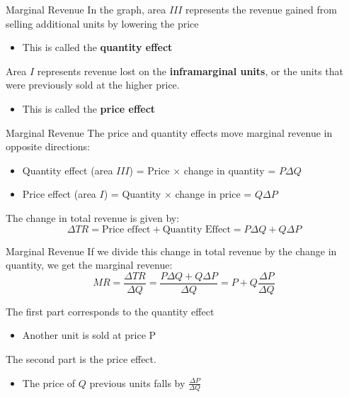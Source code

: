 \documentclass{beamer}
\begin{document}
\begin{frame}{Marginal Revenue}
  In the graph, area $III$ represents the revenue gained from selling additional units by lowering the price

  \begin{itemize}
    \item This is called the \textbf{quantity effect}
  \end{itemize}

  \bigskip
  Area $I$ represents revenue lost on the \textbf{inframarginal units}, or the units that were previously sold at the higher price.

  \begin{itemize}
    \item This is called the \textbf{price effect}
  \end{itemize}
\end{frame}

\begin{frame}{Marginal Revenue}
  The price and quantity effects move marginal revenue in opposite directions:

  \begin{itemize}
    \item Quantity effect (area $III$) = Price $\times$ change in quantity = $P \Delta Q$
    
    \item Price effect (area $I$) = Quantity $\times$ change in price = $Q \Delta P$
  \end{itemize}


  \bigskip
  The change in total revenue is given by:
  $$
    \Delta TR = \text{Price effect} + \text{Quantity Effect} = P\Delta Q + Q\Delta P
  $$
\end{frame}

\begin{frame}{Marginal Revenue}
  If we divide this change in total revenue by the change in quantity, we get the marginal revenue:
  $$
    MR = \frac{\Delta TR}{\Delta Q} = \frac{P\Delta Q + Q\Delta P}{\Delta Q}=P+Q\frac{\Delta P}{\Delta Q}
  $$
  
  \bigskip
  The first part corresponds to the quantity effect
  \begin{itemize}
    \item Another unit is sold at price P
  \end{itemize}
  
  \bigskip
  The second part is the price effect.
  \begin{itemize}
    \item The price of $Q$ previous units falls by $\frac{\Delta P}{\Delta Q}$
  \end{itemize}
\end{frame}
\end{document}
